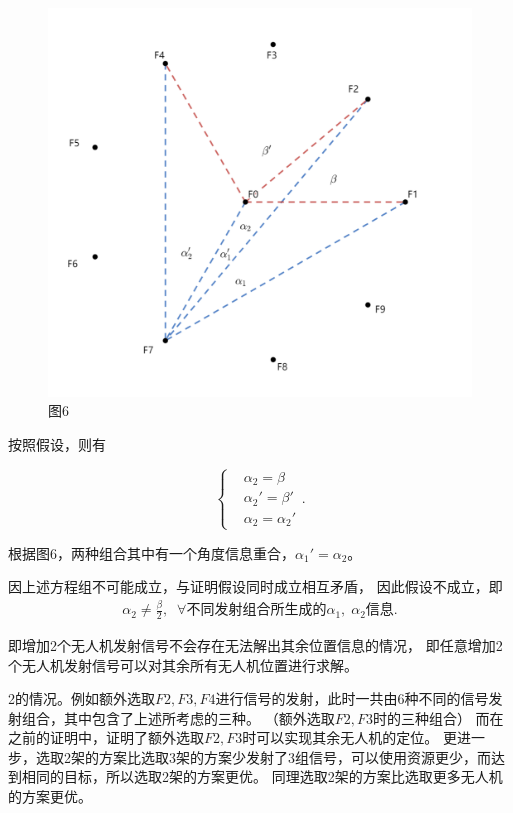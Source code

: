 \documentclass{ctexart}
\def\al{\alpha}
\def\b{\beta}
\begin{document}
	\begin{figure}[htbp]
		\centering
		\includegraphics[scale=0.45]{pic/6.png}
		\caption*{图6}
	\end{figure}

	\newpage
	按照假设，则有
	
	\[\left\{
    \begin{aligned}
		&\al_2=\b\\
		&\al_2'=\b'\\
		&\al_2=\al_2'
    \end{aligned}.
    \right.
	\]

	根据图6，两种组合其中有一个角度信息重合，$\al_1'=\al_2$。
	\par
	因上述方程组不可能成立，与证明假设同时成立相互矛盾，
	因此假设不成立，即
	\begin{align*}
		\al_2\neq \frac{\b}{2}, \;\; \forall \mbox{不同发射组合所生成的$\al_1,\;\al_2$信息}.
	\end{align*}
	\par 即增加2个无人机发射信号不会存在无法解出其余位置信息的情况，
	即任意增加2个无人机发射信号可以对其余所有无人机位置进行求解。

	2的情况。例如额外选取$F2,F3,F4$进行信号的发射，此时一共由6种不同的信号发射组合，其中包含了上述所考虑的三种。
	（额外选取$F2,F3$时的三种组合）
	而在之前的证明中，证明了额外选取$F2,F3$时可以实现其余无人机的定位。
	更进一步，选取2架的方案比选取3架的方案少发射了3组信号，可以使用资源更少，而达到相同的目标，所以选取2架的方案更优。
	同理选取2架的方案比选取更多无人机的方案更优。
	
\end{document}
